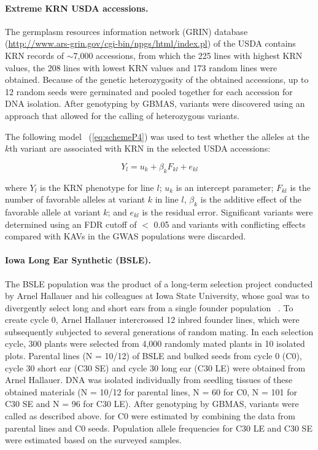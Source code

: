 \documentclass[10pt,letterpaper]{article}
\begin{document}
\paragraph{Extreme KRN USDA accessions.}
The germplasm resources information network (GRIN) database (\url{http://www.ars-grin.gov/cgi-bin/npgs/html/index.pl}) of the USDA contains KRN records of $\sim$7,000 accessions, from which the 225 lines with highest KRN values, the 208 lines with lowest KRN values and 173 random lines were obtained. Because of the genetic heterozygosity of the obtained accessions, up to 12 random seeds were germinated and pooled together for each accession for DNA isolation. After genotyping by GBMAS, variants were discovered using an approach that allowed for the calling of heterozygous variants.

The following model ~(\ref{eq:schemeP4}) was used to test whether the alleles at the $k$th variant are associated with KRN in the selected USDA accessions:

\begin{equation}\label{eq:schemeP4} 
Y_l = u_k + \beta_k F_{kl} + e_{kl}
\end{equation}

where $Y_l$ is the KRN phenotype for line $l$; $u_k$ is an intercept parameter; $F_{kl}$ is the number of favorable alleles at variant $k$ in line $l$, $\beta_k$ is the additive effect of the favorable allele at variant $k$; and $e_{kl}$ is the residual error. Significant variants were determined using an FDR cutoff of $<$ 0.05 and variants with conflicting effects compared with KAVs in the GWAS populations were discarded.
\paragraph{Iowa Long Ear Synthetic (BSLE).}
The BSLE population was the product of a long-term selection project conducted by Arnel Hallauer and his colleagues at Iowa State University, whose goal was to divergently select long and short ears from a single founder population ~\cite{Hallauer2004}. To create cycle 0, Arnel Hallauer intercrossed 12 inbred founder lines, which were subsequently subjected to several generations of random mating. In each selection cycle, 300 plants were selected from 4,000 randomly mated plants in 10 isolated plots. Parental lines (N = 10/12) of BSLE and bulked seeds from cycle 0 (C0), cycle 30 short ear (C30 SE) and cycle 30 long ear (C30 LE) were obtained from Arnel Hallauer. DNA was isolated individually from seedling tissues of these obtained materials (N = 10/12 for parental lines, N = 60 for C0, N = 101 for C30 SE and N = 96 for C30 LE). After genotyping by GBMAS, variants were called as described above. \DIFdelbegin {}\DIFdelend \DIFaddbegin {}\emph{} \DIFaddend for C0 were estimated by combining the data from parental lines and C0 seeds. Population allele frequencies for C30 LE and C30 SE were estimated based on the surveyed samples. 
\end{document}
